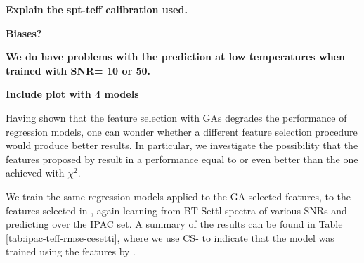 {\bf Explain the spt-teff calibration used.}

{\bf Biases?}

{\bf We do have problems with the prediction at low temperatures when
trained with SNR= 10 or 50.}

{\bf Include plot with 4 models}



Having shown that the feature selection with GAs degrades the
performance of regression models, one can wonder whether a different
feature selection procedure would produce better results. In
particular, we investigate the possibility that the features proposed
by \cite{cesetti} result in a performance equal to or even better than
the one achieved with $\chi^2$.


We train the same regression models applied to the GA selected
features, to the features selected in \cite{cesetti}, again learning
from BT-Settl spectra of various SNRs and predicting over the IPAC
set. A summary of the results can be found in Table
\ref{tab:ipac-teff-rmse-cesetti}, where we use CS- to indicate that the model was
trained using the features by \cite{cesetti}.

